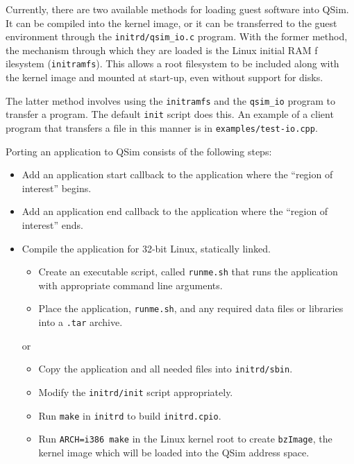 \documentclass[letterpaper, 10pt]{book}
\begin{document}
Currently, there are two available methods for loading guest software into QSim.
It can be compiled into the kernel image, or it can be transferred to the guest
environment through the \texttt{initrd/qsim\_io.c} program. With the former 
method, the mechanism through which they are loaded is the Linux initial RAM f
ilesystem (\texttt{initramfs}). This allows a root filesystem to be included
along with the kernel image and mounted at start-up, even without support for
disks.

The latter method involves using the \texttt{initramfs} and the
\texttt{qsim\_io} program to transfer a program. The default \texttt{init}
script does this. An example of a client program that transfers a file in this
manner is in \texttt{examples/test-io.cpp}.

Porting an application to QSim consists of the following steps:

\begin{itemize}
  \item{Add an application start callback to the application where the ``region
        of interest'' begins.}
  \item{Add an application end callback to the application where the ``region of
        interest'' ends.}
  \item{
    Compile the application for 32-bit Linux, statically linked.
    \begin{itemize}
      \item{Create an executable script, called \texttt{runme.sh} that runs the
            application with appropriate command line arguments.}
      \item{Place the application, \texttt{runme.sh}, and any required data
            files or libraries into a \texttt{.tar} archive.}
    \end{itemize}
    or
    \begin{itemize}
      \item{Copy the application and all needed files into
            \texttt{initrd/sbin}.}
      \item{Modify the \texttt{initrd/init} script appropriately.}
      \item{Run \texttt{make} in \texttt{initrd} to build \texttt{initrd.cpio}.}
      \item{Run \texttt{ARCH=i386 make} in the Linux kernel root to create 
            \texttt{bzImage}, the kernel image which will be loaded into the
            QSim address space.}
    \end{itemize}
    }
\end{itemize}
\end{document}
